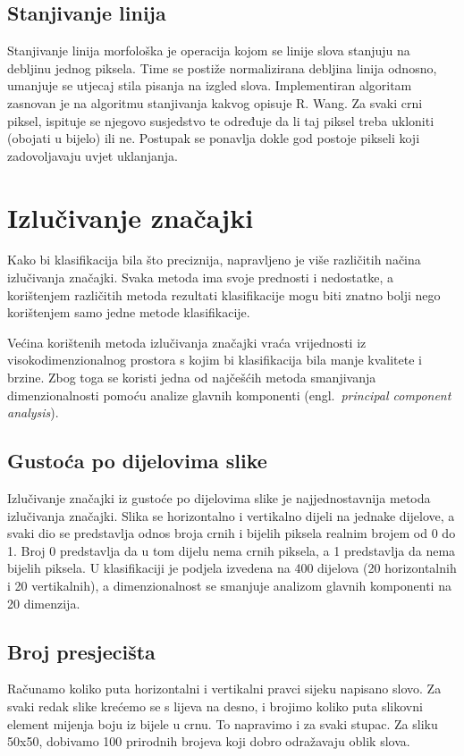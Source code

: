 \documentclass[a4paper,twocolumn,dvipdfm]{article}
\begin{document}
\subsection{Stanjivanje linija}
Stanjivanje linija morfološka je operacija kojom se linije slova stanjuju na debljinu jednog piksela. Time se postiže normalizirana debljina linija odnosno, umanjuje se utjecaj stila pisanja na izgled slova. Implementiran algoritam zasnovan je na algoritmu stanjivanja kakvog opisuje R. Wang\cite{Wang2004Online}. Za svaki crni piksel, ispituje se njegovo susjedstvo te određuje da li taj piksel treba ukloniti (obojati u bijelo) ili ne. Postupak se ponavlja dokle god postoje pikseli koji zadovoljavaju uvjet uklanjanja.

\section{Izlučivanje značajki}
Kako bi klasifikacija bila što preciznija, napravljeno je više različitih načina
izlučivanja značajki. Svaka metoda ima svoje prednosti i nedostatke, a
korištenjem različitih metoda rezultati klasifikacije mogu biti znatno bolji
nego korištenjem samo jedne metode klasifikacije.

Većina korištenih metoda izlučivanja značajki vraća vrijednosti iz
visokodimenzionalnog prostora s kojim bi klasifikacija bila manje kvalitete i
brzine. Zbog toga se koristi jedna od najčešćih metoda smanjivanja
dimenzionalnosti pomoću analize glavnih komponenti (engl.\ \emph{principal
component analysis}).

\subsection{Gustoća po dijelovima slike}
Izlučivanje značajki iz gustoće po dijelovima slike je najjednostavnija metoda
izlučivanja značajki. Slika se horizontalno i vertikalno dijeli na jednake
dijelove, a svaki dio se predstavlja odnos broja crnih i bijelih piksela realnim
brojem od 0 do 1. Broj 0 predstavlja da u tom dijelu nema crnih piksela, a 1
predstavlja da nema bijelih piksela. U klasifikaciji je podjela izvedena na 400
dijelova (20 horizontalnih i 20 vertikalnih), a dimenzionalnost se smanjuje
analizom glavnih komponenti na 20 dimenzija.

\subsection{Broj presjecišta}
Računamo koliko puta horizontalni i vertikalni pravci sijeku napisano slovo.
Za svaki redak slike krećemo se s lijeva na desno, i brojimo koliko puta slikovni element mijenja boju iz bijele u crnu.
To napravimo i za svaki stupac. Za sliku 50x50, dobivamo 100 prirodnih brojeva koji dobro odražavaju oblik slova.
\end{document}
